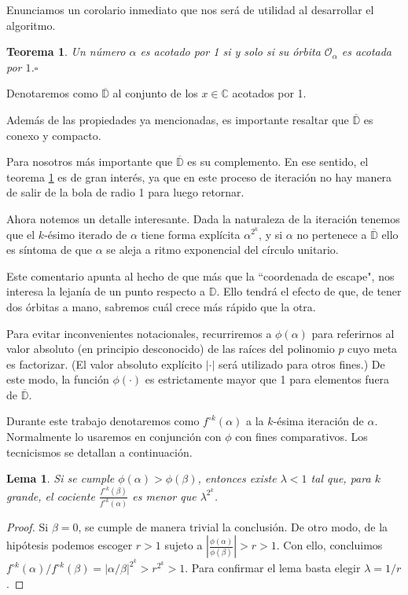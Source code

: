 \documentclass[oneside,11pt]{book}
\theoremstyle{definition}
\theoremstyle{plain}
\newtheorem{lemma}[counter]{Lema}
\newtheorem{theorem}[counter]{Teorema}
\theoremstyle{remark}
\newcommand{\eop}{\hfill$\square$}
\begin{document}
Enunciamos un corolario inmediato que nos ser\'a de utilidad al desarrollar el algoritmo.

\begin{theorem}\label{escape}
Un n\'umero $\alpha$ es acotado por 1 
si y solo si su \'orbita $\mathcal{O}_\alpha$ es acotada por $1$.\eop
\end{theorem}

Denotaremos como $\overline{{\mathbb{D}}}$ al conjunto de los $x\in \mathbb{C}$ acotados por 1.

Adem\'as de las propiedades ya mencionadas, 
es importante resaltar que $\overline{{\mathbb{D}}} $ es conexo y compacto. 

Para nosotros m\'as importante que $\overline{{\mathbb{D}}}$ es su complemento.
En ese sentido, el teorema \ref{escape} es de gran inter\'es,
ya que en este proceso de iteraci\'on no hay manera de salir de la bola de radio 1 para luego retornar.


Ahora notemos un detalle interesante. 
Dada la naturaleza de la iteraci\'on
tenemos que el $k$-\'esimo iterado de $\alpha$
tiene forma expl\'icita $\alpha^{2^k}$, 
y si $\alpha$ no pertenece a $\overline{\mathbb{D}}$ ello es s\'intoma de que $\alpha$ se aleja a ritmo exponencial 
del c\'irculo unitario.

Este comentario apunta al hecho de que m\'as que la ``coordenada de escape", 
nos interesa la lejan\'ia de un punto respecto a $\mathbb{D}$. 
Ello tendr\'a el efecto de que, de tener dos \'orbitas a mano, sabremos cu\'al crece m\'as r\'apido que la otra. 

Para evitar inconvenientes notacionales, recurriremos a $\phi(\alpha)$ 
para referirnos al valor absoluto 
(en principio desconocido) de las ra\'ices del polinomio $p$ cuyo meta es factorizar. 
(El valor absoluto expl\'icito $|\cdot |$  ser\'a utilizado para otros fines.)
De este modo, la funci\'on $\phi(\cdot)$ es estrictamente mayor que 1 
para elementos fuera de $\overline{\mathbb{D}}$. 

Durante este trabajo denotaremos como ${f^{\circ k}(\alpha)}$ a la $k$-\'esima iteraci\'on de $\alpha$. 
Normalmente lo usaremos en conjunci\'on con $\phi$ con fines comparativos. 
Los  tecnicismos se detallan a continuaci\'on. 
\medskip

\begin{lemma}
Si se cumple $\phi(\alpha)>\phi(\beta)$, 
entonces existe $\lambda<1$ tal que, para $k$ grande, 
el cociente $\displaystyle{\frac{f^{\circ k}(\beta)}{f^{\circ k}(\alpha)}}$ es menor que $\lambda^{2^k}$. 
\end{lemma}
\begin{proof}
Si $\beta=0$, se cumple de manera trivial la conclusi\'on.
De otro modo, de la hip\'otesis podemos escoger $r >1$ sujeto a 
$\displaystyle{\left |\frac{\phi(\alpha)}{\phi(\beta)}\right|> r>1}$.
Con ello, concluimos ${f^{\circ k}(\alpha)}/{f^{\circ k}(\beta)}=|{\alpha}/{\beta}|^{2^k}>r^{2^k}>1$.
Para confirmar el lema basta elegir $\lambda = {1}/{r}$.
\end{proof}
\bigskip
\end{document}
